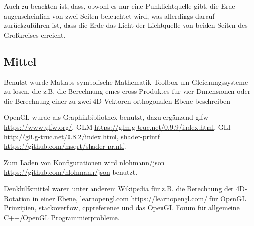 \documentclass[11pt]{article}
\begin{document}
    Auch zu beachten ist, dass, obwohl es nur eine Punklichtquelle gibt, die Erde augenscheinlich von zwei Seiten beleuchtet
    wird, was allerdings darauf zurückzuführen ist, dass die Erde das Licht der Lichtquelle von beiden Seiten des Großkreises
    erreicht.


    \subsection*{Mittel}

    Benutzt wurde Matlabs symbolische Mathematik-Toolbox um Gleichungssysteme zu lösen, die z.B. die Berechnung eines
    cross-Produktes für vier Dimensionen oder die Berechnung einer zu zwei 4D-Vektoren orthogonalen Ebene beschreiben.

    OpenGL wurde als Graphikbibliothek benutzt, dazu ergänzend glfw \url{https://www.glfw.org/}, GLM
    \url{https://glm.g-truc.net/0.9.9/index.html}, GLI \url{http://gli.g-truc.net/0.8.2/index.html},
    shader-printf \url{https://github.com/msqrt/shader-printf}.

    Zum Laden von Konfigurationen wird nlohmann/json \url{https://github.com/nlohmann/json} benutzt.

    Denkhilfsmittel waren unter anderem Wikipedia für z.B. die Berechnung der 4D-Rotation in einer Ebene,
    learnopengl.com \url{https://learnopengl.com/} für OpenGL Prinzipien, stackoverflow, cppreference und das OpenGL Forum für
    allgemeine C++/OpenGL Programmierprobleme.
\end{document}
